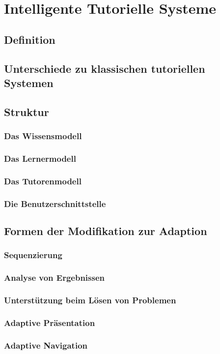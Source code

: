 \chapter{Intelligente Tutorielle Systeme}

\section{Definition}

\section{Unterschiede zu klassischen tutoriellen Systemen}

\section{Struktur}

\subsection{Das Wissensmodell}

\subsection{Das Lernermodell}

\subsection{Das Tutorenmodell}

\subsection{Die Benutzerschnittstelle}

\section{Formen der Modifikation zur Adaption}

\subsection{Sequenzierung}

\subsection{Analyse von Ergebnissen}

\subsection{Unterstützung beim Lösen von Problemen}

\subsection{Adaptive Präsentation}

\subsection{Adaptive Navigation}
